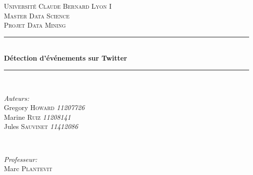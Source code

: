 \documentclass[12pt]{article}
\begin{document}
\begin{titlepage}

\newcommand{\HRule}{\rule{\linewidth}{0.5mm}} %


\center %
 

\textsc{\LARGE Universit\'e Claude Bernard Lyon I}\\[1.5cm] %
\textsc{\Large Master Data Science}\\[0.5cm] %
\textsc{\large Projet Data Mining}\\[0.5cm] %


\HRule \\[0.4cm]
{ \huge \bfseries D\'etection d'\'ev\'enements sur Twitter}\\[0.4cm] %
\HRule \\[1.5cm]
 

\begin{minipage}{0.4\textwidth}
\begin{flushleft} \large
\emph{Auteurs:}\\
Gregory \textsc{Howard} \textit{11207726} \\ 
Marine \textsc{Ruiz} \textit{11208141} \\ 
Jules \textsc{Sauvinet} \textit{11412086}
\end{flushleft}
\end{minipage}
~
\begin{minipage}{0.4\textwidth}
\begin{flushright} \large
\emph{Professeur:} \\
Marc \textsc{Plantevit} %
\end{flushright}
\end{minipage}\\[2cm]


\end{titlepage}
\end{document}
